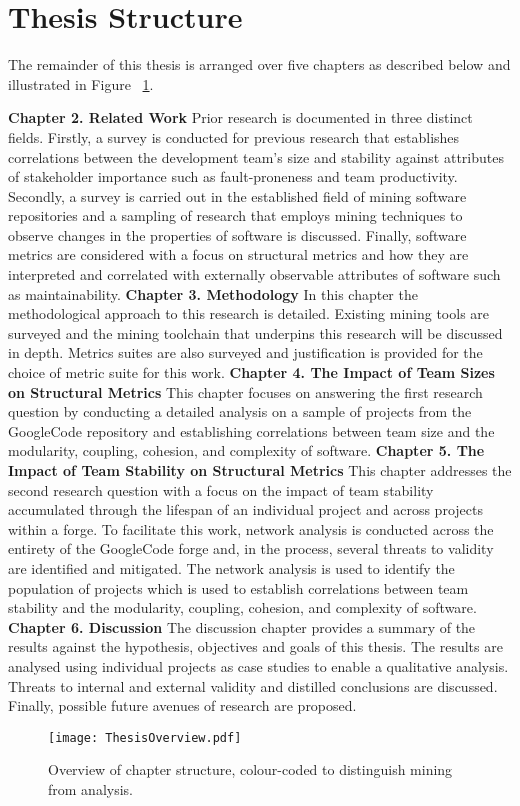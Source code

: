 \section{Thesis Structure} %
The remainder of this thesis is arranged over five chapters as described below and illustrated in Figure ~\ref{fig:ThesisOverview}.

\textbf{Chapter 2. Related Work} Prior research is documented in three distinct fields. Firstly, a survey is conducted for previous research that establishes correlations between the development team's size and stability against attributes of stakeholder importance such as fault-proneness and team productivity. Secondly, a survey is carried out in the established field of mining software repositories and a sampling of research that employs mining techniques to observe changes in the properties of software is discussed. Finally, software metrics are considered with a focus on structural metrics and how they are interpreted and correlated with externally observable attributes of software such as maintainability.
\newline
\newline
\textbf{Chapter 3. Methodology} In this chapter the methodological approach to this research is detailed. Existing mining tools are surveyed and the mining toolchain that underpins this research will be discussed in depth. Metrics suites are also surveyed and justification is provided for the choice of metric suite for this work. 
\newline
\newline
\textbf{Chapter 4. The Impact of Team Sizes on Structural Metrics} This chapter focuses on answering the first research question by conducting a detailed analysis on a sample of projects from the GoogleCode repository and establishing correlations between team size and the modularity, coupling, cohesion, and complexity of software.
\newline
\newline
\textbf{Chapter 5. The Impact of Team Stability on Structural Metrics} This chapter addresses the second research question with a focus on the impact of team stability accumulated through the lifespan of an individual project and across projects within a forge. To facilitate this work, network analysis is conducted across the entirety of the GoogleCode forge and, in the process, several threats to validity are identified and mitigated. The network analysis is used to identify the population of projects which is used to establish correlations between team stability and the modularity, coupling, cohesion, and complexity of software.
\newline
\newline
\textbf{Chapter 6. Discussion} The discussion chapter provides a summary of the results against the hypothesis, objectives and goals of this thesis. The results are analysed using individual projects as case studies to enable a qualitative analysis. Threats to internal and external validity and distilled conclusions are discussed. Finally, possible future avenues of research are proposed.

\begin{landscape}
\begin{figure}[htbp!] 
\centering    
\texttt{[image: ThesisOverview.pdf]}
\caption[Thesis overview.]{Overview of chapter structure, colour-coded to distinguish mining from analysis.}
\label{fig:ThesisOverview}
\end{figure}
\end{landscape}
